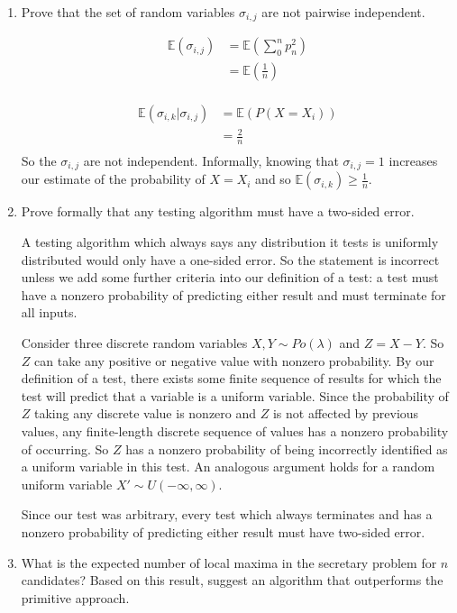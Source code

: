 \documentclass[10pt,\jkfside,a4paper]{article}
\begin{document}
\begin{enumerate}
\item Prove that the set of random variables $\sigma_{i, j}$ are not pairwise independent.

\[
\begin{split}
\mathbb{E}(\sigma_{i, j})
&= \mathbb{E}\left(\sum^{n}_{0} p_n^2\right) \\
&= \mathbb{E}\left( \frac{1}{n} \right) \\
\end{split}
\]

\[
\begin{split}
\mathbb{E}(\sigma_{i, k} | \sigma_{i, j})
&= \mathbb{E}(P(X = X_i)) \\
&= \frac{2}{n} \\
\end{split}
\]
So the $\sigma_{i, j}$ are not independent. Informally, knowing that $\sigma_{i, j} = 1$ increases
our estimate of the probability of $X = X_i$ and so $\mathbb{E}(\sigma_{i, k}) \geq \frac{1}{n}$.

\item Prove formally that any testing algorithm must have a two-sided error.

A testing algorithm which always says any distribution it tests is uniformly
distributed would only have a one-sided error. So the statement is incorrect
unless we add some further criteria into our definition of a test:
a test must have a nonzero probability of predicting either result and must
terminate for all inputs.

Consider three discrete random variables $X, Y \sim Po(\lambda)$ and $Z = X - Y$.
So $Z$ can take any positive or negative value with nonzero probability.
By our definition of a test,
there exists some finite sequence of results for which the test will predict
that a variable is a uniform variable. Since the probability of $Z$ taking any
discrete value is nonzero and $Z$ is not affected by previous values, any
finite-length discrete sequence of values has a nonzero probability of occurring.
So $Z$ has a nonzero probability of being incorrectly identified as a uniform
variable in this test. An analogous argument holds for a random uniform variable
$X' \sim U(-\infty, \infty)$.

Since our test was arbitrary, every test which always terminates and has a
nonzero probability of predicting either result must have two-sided error.

\item What is the expected number of local maxima in the secretary problem for $n$ candidates?
Based on this result, suggest an algorithm that outperforms the primitive approach.


\end{enumerate}
\end{document}
